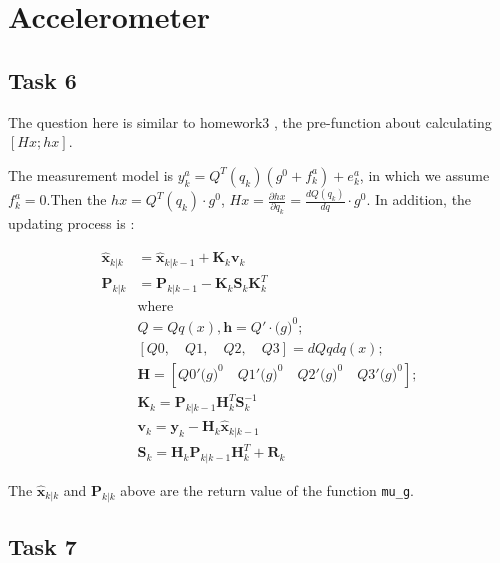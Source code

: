 \section{Accelerometer}

\subsection{Task 6}

The question here is similar to homework3 , the pre-function about calculating $ [Hx  ; hx] $.

The measurement model is $ y_k^a=Q^T(q_k)(g^0+f_k^a)+e_k^a $, in which we assume $ f_k^a = 0 $.Then the $ hx = Q^T(q_k) \cdot g^0 $, $ Hx = \frac{\partial{hx}}{\partial{q_k}} = \frac{dQ(q_k)}{dq} \cdot g^0$. In addition, the updating process is :

\begin{equation}
    \begin{aligned}
        \hat{\mathbf{x}}_{k|k}&=\hat{\mathbf{x}}_{k|k-1}+\mathbf{K}_k\mathbf{v}_k\\
        \mathbf{P}_{k|k}&=\mathbf{P}_{k|k-1}-\mathbf{K}_{k}\mathbf{S}_{k}\mathbf{K}_{k}^{T}\\
        &\text{where}\\
        & Q = Qq(x),
        \mathbf{h}  = Q'\cdot \mathbf(g)^0;\\
&[Q0, \quad Q1, \quad Q2,\quad  Q3] = dQqdq(x);\\
&\mathbf{H} = [Q0'\mathbf(g)^0 \quad Q1'\mathbf(g)^0 \quad Q2'\mathbf(g)^0 \quad Q3'\mathbf(g)^0];\\
        &\mathbf{K}_k=\mathbf{P}_{k|k-1}\mathbf{H}_k^T\mathbf{S}_k^{-1}\\
        &\mathbf{v}_k=\mathbf{y}_k-\mathbf{H}_k\hat{\mathbf{x}}_{k|k-1}\\
        &\mathbf{S}_k=\mathbf{H}_k\mathbf{P}_{k|k-1}\mathbf{H}_k^T+\mathbf{R}_k\nonumber
    \end{aligned}
\end{equation}



The $\hat{\mathbf{x}}_{k|k}$ and $ \mathbf{P}_{k|k}  $ above are the return value of the function \texttt{mu\_g}.

\subsection{Task 7}


